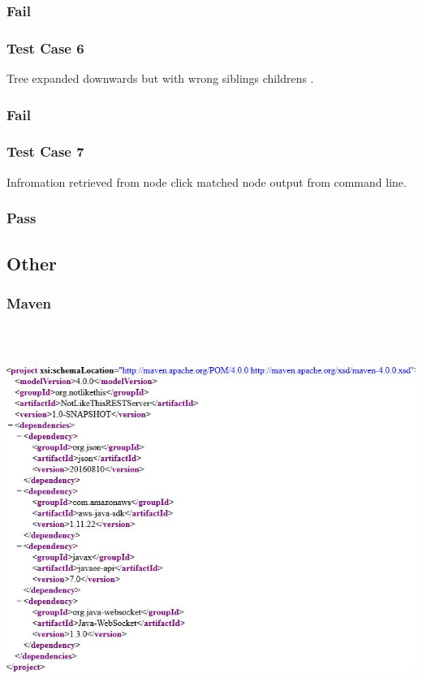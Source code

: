\documentclass[hidelinks,a4paper,12pt]{article}
\begin{document}
\subsubsection{Fail}
\subsubsection{Test Case 6}
Tree expanded downwards but with wrong siblings childrens .
\subsubsection{Fail}
\subsubsection{Test Case 7}
Infromation retrieved from node click matched node output from command line.
\subsubsection{Pass}

\subsection{Other}
\subsubsection{Maven}
\includegraphics[width=17.3cm,height=12.5cm]{./images/maven.jpg}
\end{document}
